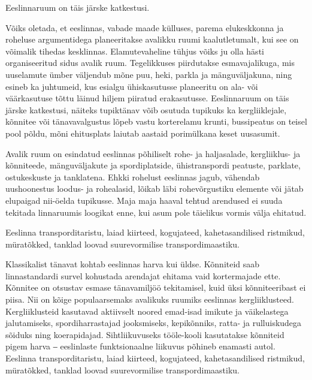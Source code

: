 \documentclass[estonian,]{article}
\begin{document}
\begin{blockquote-left}
Eeslinnaruum on täis järske katkestusi.
\end{blockquote-left}

Võiks oletada, et eeslinnas, vabade maade külluses, parema elukeskkonna ja roheluse argumentidega planeeritakse avalikku ruumi kaalutletumalt, kui see on võimalik tihedas kesklinnas. Elamutevaheline tühjus võiks ju olla hästi organiseeritud sidus avalik ruum. Tegelikkuses piirdutakse esmavajalikuga, mis uuselamute ümber väljendub mõne puu, heki, parkla ja mänguväljakuna, ning esineb ka juhtumeid, kus esialgu ühiskasutusse planeeritu on ala- või väärkasutuse tõttu läinud hiljem piiratud erakasutusse. Eeslinnaruum on täis järske katkestusi, näiteks tupiktänav võib osutuda tupikuks ka kergliiklejale, kõnnitee või tänavavalgustus lõpeb vastu korterelamu krunti, bussipeatus on teisel pool põldu, mõni ehitusplats laiutab aastaid porimülkana keset uusasumit.

Avalik ruum on esindatud eeslinnas põhiliselt rohe- ja haljasalade, kergliiklus- ja kõnniteede, mänguväljakute ja spordiplatside, ühistranspordi peatuste, parklate, ostukeskuste ja tanklatena. Ehkki rohelust eeslinnas jagub, vähendab uushoonestus loodus- ja rohealasid, lõikab läbi rohevõrgustiku elemente või jätab elupaigad nii-öelda tupikusse. Maja maja haaval tehtud arendused ei suuda tekitada linnaruumis loogikat enne, kui asum pole täielikus vormis välja ehitatud.

\begin{blockquote-left}
Eeslinna transporditaristu, laiad kiirteed, kogujateed, kahetasandilised
ristmikud, müratõkked, tanklad loovad suurevormilise transpordimaastiku.
\end{blockquote-left}

Klassikalist tänavat kohtab eeslinnas harva kui üldse. Kõnniteid saab linnastandardi survel kohustada arendajat ehitama vaid kortermajade ette. Kõnnitee on otsustav esmase tänavamiljöö tekitamisel, kuid üksi kõnniteeribast ei piisa. Nii on kõige populaarsemaks avalikuks ruumiks eeslinnas kergliiklusteed. Kergliiklusteid kasutavad aktiivselt noored emad-isad imikute ja väikelastega jalutamiseks, spordiharrastajad jooksmiseks, kepikõnniks, ratta- ja rulluiskudega sõiduks ning koerapidajad. Sihtliikuvuseks tööle-kooli kasutatakse kõnniteid pigem harva ‒ eeslinlaste funktsionaalne liikuvus põhineb enamasti autol. Eeslinna transporditaristu, laiad kiirteed, kogujateed, kahetasandilised ristmikud, müratõkked, tanklad loovad suurevormilise transpordimaastiku.
\end{document}
